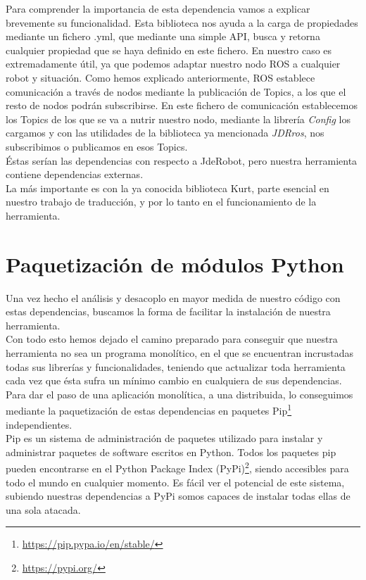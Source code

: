 Para comprender la importancia de esta dependencia vamos a explicar brevemente su funcionalidad. Esta biblioteca nos ayuda a la carga de propiedades mediante un fichero .yml, que mediante una simple API, busca y retorna cualquier propiedad que se haya definido en este fichero. En nuestro caso es extremadamente útil, ya que podemos adaptar nuestro nodo ROS a cualquier robot y situación. Como hemos explicado anteriormente, ROS establece comunicación a través de nodos mediante la publicación de Topics, a los que el resto de nodos podrán subscribirse. En este fichero de comunicación establecemos los Topics de los que se va a nutrir nuestro nodo, mediante la librería \textit{Config} los cargamos y con las utilidades de la biblioteca ya mencionada \textit{JDRros}, nos subscribimos o publicamos en esos Topics.\\

Éstas serían las dependencias con respecto a JdeRobot, pero nuestra herramienta contiene dependencias externas.\\

La más importante es con la ya conocida biblioteca Kurt, parte esencial en nuestro trabajo de traducción, y por lo tanto en el funcionamiento de la herramienta.

\section{Paquetización de módulos Python}
\label{sec:pip}
Una vez hecho el análisis y desacoplo en mayor medida de nuestro código con estas dependencias, buscamos la forma de facilitar la instalación de nuestra herramienta.\\

Con todo esto hemos dejado el camino preparado para conseguir que nuestra herramienta no sea un programa monolítico, en el que se encuentran incrustadas todas sus librerías y funcionalidades, teniendo que actualizar toda herramienta cada vez que ésta sufra un mínimo cambio en cualquiera de sus dependencias. \\

Para dar el paso de una aplicación monolítica, a una distribuida, lo conseguimos mediante la paquetización de estas dependencias en paquetes Pip\footnote{\url{https://pip.pypa.io/en/stable/}} independientes.\\

Pip es un sistema de administración de paquetes utilizado para instalar y administrar paquetes de software escritos en Python. Todos los paquetes pip pueden encontrarse en el Python Package Index (PyPi)\footnote{\url{https://pypi.org/}}, siendo accesibles para todo el mundo en cualquier momento. Es fácil ver el potencial de este sistema, subiendo nuestras dependencias a PyPi somos capaces de instalar todas ellas de una sola atacada.\\

